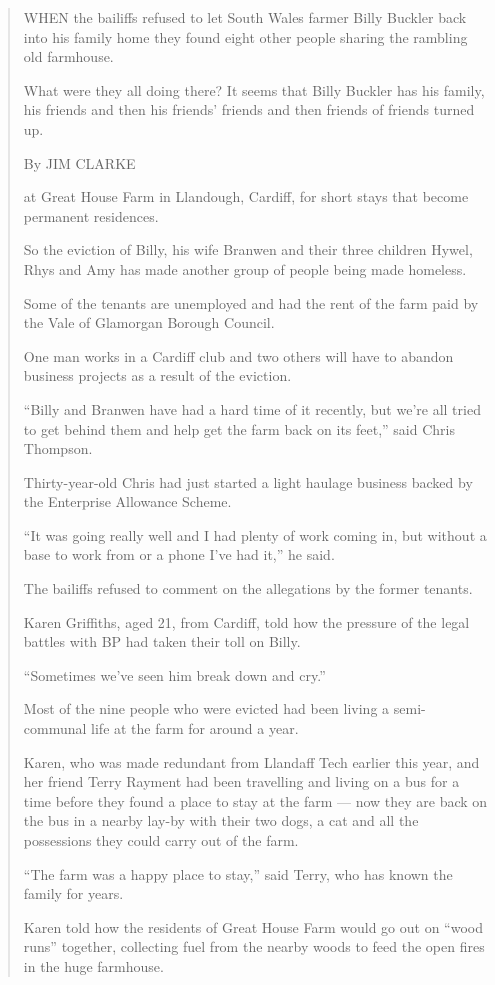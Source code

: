 \documentclass[11pt,a4paper]{article}
\begin{document}
\begin{quote}
WHEN the bailiffs refused to let South Wales farmer Billy Buckler back into his family home they found eight other people sharing the rambling old farmhouse.

What were they all doing there? It seems that Billy Buckler has his family, his friends and then his friends' friends and then friends of friends turned up.

By JIM CLARKE

at Great House Farm in Llandough, Cardiff, for short stays that become permanent residences.

So the eviction of Billy, his wife Branwen and their three children Hywel, Rhys and Amy has made another group of people being made homeless.

Some of the tenants are unemployed and had the rent of the farm paid by the Vale of Glamorgan Borough Council.

One man works in a Cardiff club and two others will have to abandon business projects as a result of the eviction.

``Billy and Branwen have had a hard time of it recently, but we're all tried to get behind them and help get the farm back on its feet,'' said Chris Thompson.

Thirty-year-old Chris had just started a light haulage business backed by the Enterprise Allowance Scheme.

``It was going really well and I had plenty of work coming in, but without a base to work from or a phone I've had it,'' he said.

The bailiffs refused to comment on the allegations by the former tenants.

Karen Griffiths, aged 21, from Cardiff, told how the pressure of the legal battles with BP had taken their toll on Billy.

``Sometimes we've seen him break down and cry.''

Most of the nine people who were evicted had been living a semi-communal life at the farm for around a year.

Karen, who was made redundant from Llandaff Tech earlier this year, and her friend Terry Rayment had been travelling and living on a bus for a time before they found a place to stay at the farm --- now they are back on the bus in a nearby lay-by with their two dogs, a cat and all the possessions they could carry out of the farm.

``The farm was a happy place to stay,'' said Terry, who has known the family for years.

Karen told how the residents of Great House Farm would go out on ``wood runs'' together, collecting fuel from the nearby woods to feed the open fires in the huge farmhouse.
\end{quote}
\end{document}
